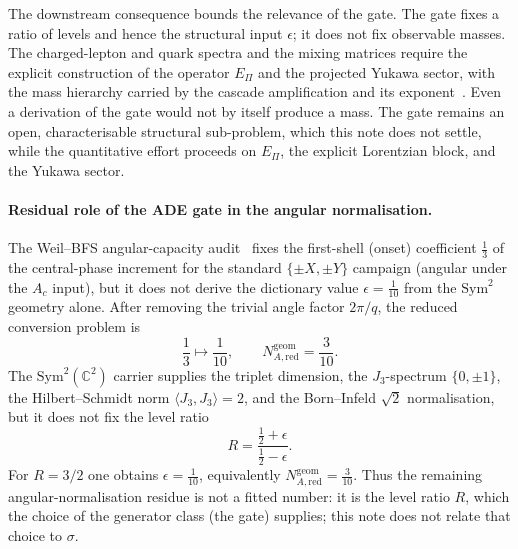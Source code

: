 \documentclass[11pt]{article}
\theoremstyle{definition}
\theoremstyle{remark}
\begin{document}
    The downstream consequence bounds the relevance of the gate.
    The gate fixes a ratio of levels and hence the structural input $\epsilon$; it does not fix observable masses.
    The charged-lepton and quark spectra and the mixing matrices require the explicit construction of the operator
    $E_\Pi$ and the projected Yukawa sector, with the mass hierarchy carried by the cascade amplification and its
    exponent~\cite{Beau2026fmnote,Beau2026prs,Beau2026a4}.
    Even a derivation of the gate would not by itself produce a mass.
    The gate remains an open, characterisable structural sub-problem, which this note does not settle, while the
    quantitative effort proceeds on $E_\Pi$, the explicit Lorentzian block, and the Yukawa sector.

    \paragraph{Residual role of the ADE gate in the angular normalisation.}
    The Weil--BFS angular-capacity audit~\cite{Beau2026aar} fixes the first-shell (onset) coefficient $\tfrac13$ of the central-phase increment for the standard $\{\pm X,\pm Y\}$ campaign (angular under the $A_c$ input), but
    it does not derive the dictionary value $\epsilon=\tfrac{1}{10}$ from the $\mathrm{Sym}^2$ geometry alone.
    After removing the trivial angle factor $2\pi/q$, the reduced conversion problem is
    \[
      \frac{1}{3}\longmapsto \frac{1}{10},
      \qquad
      N_{A,\mathrm{red}}^{\mathrm{geom}}=\frac{3}{10}.
    \]
    The $\mathrm{Sym}^2(\mathbb{C}^2)$ carrier supplies the triplet dimension, the $J_3$-spectrum $\{0,\pm1\}$, the
    Hilbert--Schmidt norm $\langle J_3,J_3\rangle=2$, and the Born--Infeld $\sqrt2$ normalisation, but it does not fix
    the level ratio
    \[
      R=\frac{\tfrac12+\epsilon}{\tfrac12-\epsilon}.
    \]
    For $R=3/2$ one obtains $\epsilon=\tfrac{1}{10}$, equivalently $N_{A,\mathrm{red}}^{\mathrm{geom}}=\tfrac{3}{10}$.
    Thus the remaining angular-normalisation residue is not a fitted number: it is the level ratio $R$, which the choice of
    the generator class (the gate) supplies; this note does not relate that choice to $\sigma$.
\end{document}

